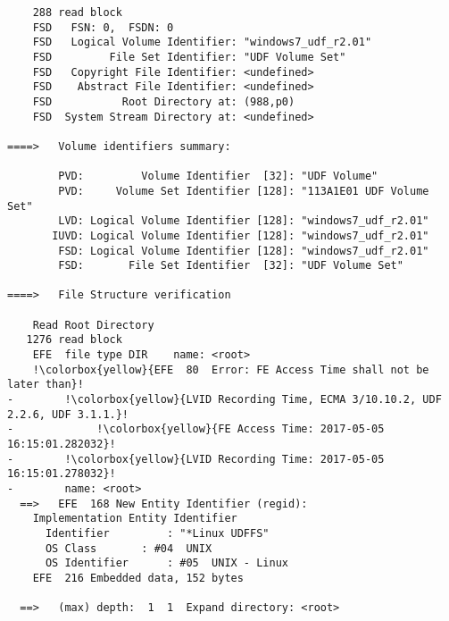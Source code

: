\begin{lstlisting}
    288 read block
    FSD   FSN: 0,  FSDN: 0
    FSD   Logical Volume Identifier: "windows7_udf_r2.01"
    FSD         File Set Identifier: "UDF Volume Set"
    FSD   Copyright File Identifier: <undefined>
    FSD    Abstract File Identifier: <undefined>
    FSD           Root Directory at: (988,p0)
    FSD  System Stream Directory at: <undefined>

====>   Volume identifiers summary:

        PVD:         Volume Identifier  [32]: "UDF Volume"
        PVD:     Volume Set Identifier [128]: "113A1E01 UDF Volume Set"
        LVD: Logical Volume Identifier [128]: "windows7_udf_r2.01"
       IUVD: Logical Volume Identifier [128]: "windows7_udf_r2.01"
        FSD: Logical Volume Identifier [128]: "windows7_udf_r2.01"
        FSD:       File Set Identifier  [32]: "UDF Volume Set"

====>   File Structure verification

    Read Root Directory
   1276 read block
    EFE  file type DIR    name: <root>
    !\colorbox{yellow}{EFE  80  Error: FE Access Time shall not be later than}!
-        !\colorbox{yellow}{LVID Recording Time, ECMA 3/10.10.2, UDF 2.2.6, UDF 3.1.1.}!
-             !\colorbox{yellow}{FE Access Time: 2017-05-05 16:15:01.282032}!
-        !\colorbox{yellow}{LVID Recording Time: 2017-05-05 16:15:01.278032}!
-        name: <root>
  ==>   EFE  168 New Entity Identifier (regid):
    Implementation Entity Identifier
      Identifier         : "*Linux UDFFS"
      OS Class       : #04  UNIX
      OS Identifier      : #05  UNIX - Linux
    EFE  216 Embedded data, 152 bytes

  ==>   (max) depth:  1  1  Expand directory: <root>


\end{lstlisting}
